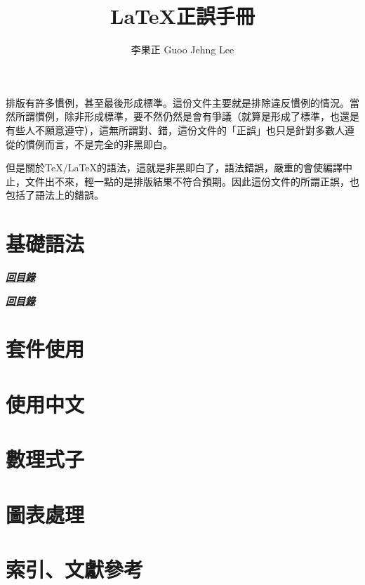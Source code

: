 \documentclass[11pt,a4paper]{article}
\title{\textsf{\textbf{\LaTeX 正誤手冊}}}
\author{\small 李果正 Guoo Jehng Lee}
\date{\small \zhtoday}
\newcommand{\back}{%
  \begin{flushright}
  \hyperlink{contents}{\textit{\textbf{\textcolor{bulgarianrose}{回目錄}}}}
  \end{flushright}}
\begin{document}
\maketitle

排版有許多慣例，甚至最後形成標準。這份文件主要就是排除違反慣例的情況。當然所謂慣例，除非形成標準，要不然仍然是會有爭議（就算是形成了標準，也還是有些人不願意遵守），這無所謂對、錯，這份文件的「正誤」也只是針對多數人遵從的慣例而言，不是完全的非黑即白。

但是關於\TeX/\LaTeX 的語法，這就是非黑即白了，語法錯誤，嚴重的會使編譯中止，文件出不來，輕一點的是排版結果不符合預期。因此這份文件的所謂正誤，也包括了語法上的錯誤。

\section{基礎語法}
\label{sec:syntax}



\back



\back

\section{套件使用}
\label{sec:package}

\section{使用中文}
\label{sec:chinese}

\section{數理式子}
\label{sec:math}

\section{圖表處理}
\label{sec:figure}

\section{索引、文獻參考}
\label{sec:index}

\clearpage
\hypertarget{contents}{}
\tableofcontents
\end{document}
